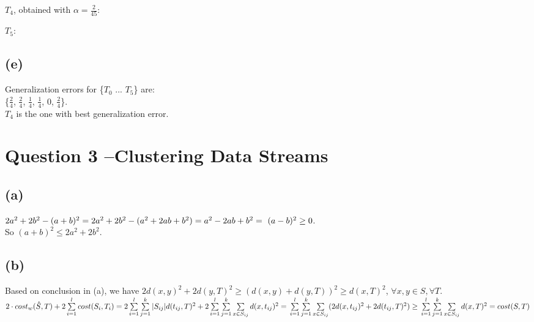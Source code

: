 \documentclass{article}
\begin{document}
$T_4$, obtained with $\alpha=\frac{2}{45}$:


$T_5$:


\subsection{(e)}
Generalization errors for \{$T_0$ ... $T_5$\} are: \\
\{$\frac{2}{4}$, $\frac{2}{4}$, $\frac{1}{4}$, $\frac{1}{4}$, $0$, $\frac{2}{4}$\}. \\
$T_4$ is the one with best generalization error.


\section{Question 3 --Clustering Data Streams}
\subsection{(a)}
$2a^2 + 2b^2 - (a+b)^2 = \\
2a^2 + 2b^2 - (a^2 + 2ab + b^2) =\\
a^2 - 2ab + b^2 =\
(a-b)^2 \ge 0$.\\
So $(a+b)^2 \le 2a^2 + 2b^2$.

\subsection{(b)}
Based on conclusion in (a), we have $2d(x, y)^2 + 2d(y, T)^2 \ge (d(x,y)+d(y,T))^2 \ge d(x, T)^2$, $\forall x,y \in S, \forall T$.  \\
$2\cdot cost_w(\hat S,T) + 2\sum\limits_{i=1}^{l}cost(S_i, T_i) = \\
2 \sum\limits_{i=1}^{l}\sum\limits_{j=1}^{k}|S_{ij}|d(t_{ij}, T)^2 + 2\sum\limits_{i=1}^{l}\sum\limits_{j=1}^{k}\sum\limits_{x \in S_{ij}} d(x,t_{ij})^2 = \\
\sum\limits_{i=1}^{l}\sum\limits_{j=1}^{k}\sum\limits_{x \in S_{ij}} (2d(x,t_{ij})^2 + 2d(t_{ij},T)^2) \ge \\
\sum\limits_{i=1}^{l}\sum\limits_{j=1}^{k}\sum\limits_{x \in S_{ij}}d(x,T)^2 =\\
cost(S,T)$
\end{document}
